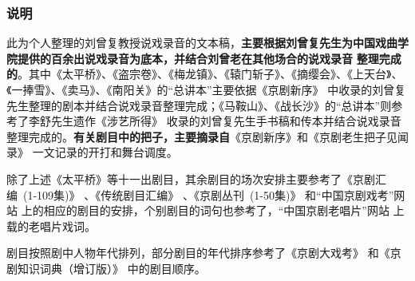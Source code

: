 \newpage
\hypertarget{ux8bf4-ux660e}{
	\subsubsection{\hei \large 说\hspace{35pt}明}\label{ux8bf4-ux660e}}
\thispagestyle{fancy}    %

	此为个人整理的刘曾复教授说戏录音的文本稿，\textbf{主要根据刘曾复先生为中国戏曲学院提供的百余出说戏录音为底本，并结合刘曾老在其他场合的说戏录音}%
\textbf{整理完成的}。其中《太平桥》、《盗宗卷》、《梅龙镇》、《辕门斩子》、《摘缨会》、《上天台》、《一捧雪》、《卖马》、《南阳关》的``总讲本''主要依据《京剧新序》%
中收录的刘曾复先生整理的剧本并结合说戏录音整理完成；《马鞍山》、《战长沙》的``总讲本''则参考了李舒先生遗作《涉艺所得》%
收录的刘曾复先生手书稿和传本并结合说戏录音整理完成的。\textbf{有关剧目中的把子，主要摘录自}《京剧新序》和《京剧老生把子见闻录》%
一文记录的开打和舞台调度。

除了上述《太平桥》等十一出剧目，其余剧目的场次安排主要参考了《京剧汇编~(1-109集)》%
、《传统剧目汇编》%
、《京剧丛刊~(1-50集)》%
和``中国京剧戏考''网站%
上的相应的剧目的安排，个别剧目的词句也参考了，``中国京剧老唱片''网站%
上载的老唱片戏词。

剧目按照剧中人物年代排列，部分剧目的年代排序参考了《京剧大戏考》%
和《京剧知识词典（增订版）》%
中的剧目顺序。

